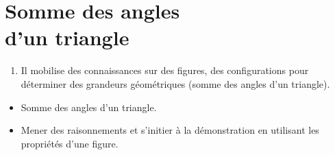 \themaE
\graphicspath{{../../S09_Somme_des_angles_d_un_triangle/Images/}}

\chapter{Somme des angles\\d'un triangle}
\label{S09}

\renewcommand{\RedactionSomme}{La somme des angles du triangle $\NomTriangle$ fait \udeg{180} d'où :}


\begin{autoeval}
   \small
   \begin{enumerate}
      \item Il mobilise des connaissances sur des figures, des configurations pour déterminer des grandeurs géométriques (somme des angles d'un triangle).
   \end{enumerate}
\end{autoeval}

\begin{prerequis}
   \begin{itemize}
      \item Somme des angles d'un triangle.
      \item Mener des raisonnements et s'initier à la démonstration en utilisant les propriétés d'une figure.
   \end{itemize}
\end{prerequis}

\vfill

